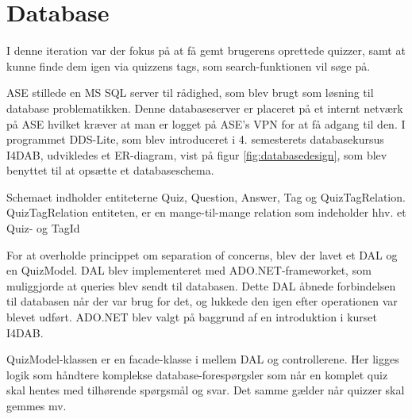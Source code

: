 \section{Database}
I denne iteration var der fokus på at få gemt brugerens oprettede quizzer, samt at kunne finde dem igen via quizzens tags, som search-funktionen vil søge på.

ASE stillede en MS SQL server \citep{sqlserverWeb} til rådighed, som blev brugt som løsning til database problematikken. Denne databaseserver er placeret på et internt netværk på ASE hvilket kræver at man er logget på ASE's VPN for at få adgang til den. I programmet DDS-Lite, som blev introduceret i 4. semesterets databasekursus I4DAB, udvikledes et ER-diagram, vist på figur \ref{fig:databasedesign}, som blev benyttet til at opsætte et databaseschema.

Schemaet indholder entiteterne Quiz, Question, Answer, Tag og QuizTagRelation. QuizTagRelation entiteten, er en mange-til-mange relation som indeholder hhv. et Quiz- og TagId


For at overholde princippet om separation of concerns, blev der lavet et DAL og en QuizModel. DAL blev implementeret med ADO.NET-frameworket, som muliggjorde at queries blev sendt til databasen. Dette DAL åbnede forbindelsen til databasen når der var brug for det, og lukkede den igen efter operationen var blevet udført. ADO.NET blev valgt på baggrund af en introduktion i kurset I4DAB. 

QuizModel-klassen er en facade-klasse i mellem DAL og controllerene. Her ligges logik som håndtere komplekse database-forespørgsler som når en komplet quiz skal hentes med tilhørende spørgsmål og svar. Det samme gælder når quizzer skal gemmes mv.
